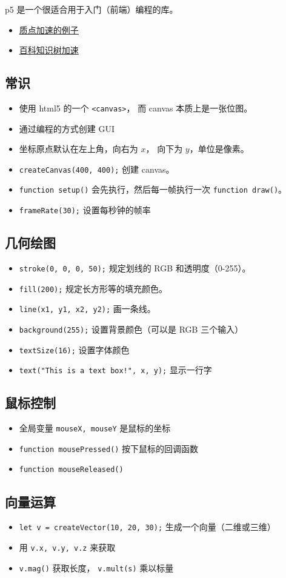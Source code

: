 

p5 是一个很适合用于入门（前端）编程的库。

\begin{itemize}
\item \href{https://wuli.wiki/apps/PtAcc/}{质点加速的例子}
\item \href{https://wuli.wiki/apps/TwoBallSpring/}{百科知识树加速}
\end{itemize}

\subsection{常识}
\begin{itemize}
\item 使用 html5 的一个 \verb`<canvas>`， 而 canvas 本质上是一张位图。
\item 通过编程的方式创建 GUI
\item 坐标原点默认在左上角，向右为 $x$， 向下为 $y$，单位是像素。
\item \verb`createCanvas(400, 400);` 创建 canvas。
\item \verb`function setup()` 会先执行，然后每一帧执行一次 \verb`function draw()`。
\item \verb`frameRate(30);` 设置每秒钟的帧率
\end{itemize}

\subsection{几何绘图}
\begin{itemize}
\item \verb`stroke(0, 0, 0, 50);` 规定划线的 RGB 和透明度（0-255）。
\item \verb`fill(200);` 规定长方形等的填充颜色。
\item \verb`line(x1, y1, x2, y2);` 画一条线。
\item \verb`background(255);` 设置背景颜色（可以是 RGB 三个输入）
\item \verb`textSize(16);` 设置字体颜色
\item \verb`text("This is a text box!", x, y);` 显示一行字
\end{itemize}

\subsection{鼠标控制}
\begin{itemize}
\item 全局变量 \verb`mouseX, mouseY` 是鼠标的坐标
\item \verb`function mousePressed()` 按下鼠标的回调函数
\item \verb`function mouseReleased()`
\end{itemize}

\subsection{向量运算}
\begin{itemize}
\item \verb`let v = createVector(10, 20, 30);` 生成一个向量（二维或三维）
\item 用 \verb`v.x, v.y, v.z` 来获取
\item \verb`v.mag()` 获取长度， \verb`v.mult(s)` 乘以标量
\end{itemize}

